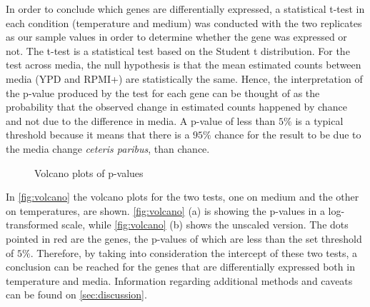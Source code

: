 \documentclass[11pt,twoside]{article}
\numberwithin{Theorem}{section}
\numberwithin{Definition}{section}
\numberwithin{Lemma}{section}
\numberwithin{Algorithm}{section}
\numberwithin{equation}{section}
\begin{document}
In order to conclude which genes are differentially expressed, a statistical t-test in each condition (temperature and medium) was conducted with the two replicates as our sample values in order to determine whether the gene was expressed or not. The t-test is a statistical test based on the Student t distribution. For the test across media, the null hypothesis is that the mean estimated counts between media (YPD and RPMI+) are statistically the same. Hence, the interpretation of the p-value produced by the test for each gene can be thought of as the probability that the observed change in estimated counts happened by chance and not due to the difference in media. A p-value of less than $5\%$ is a typical threshold because it means that there is a $95\%$ chance for the result to be due to the media change \emph{ceteris paribus}, than chance. 

\begin{figure}[h]
    \centering
    \caption{Volcano plots of p-values}
    \label{fig:volcano}
\end{figure}

In \autoref{fig:volcano} the volcano plots for the two tests, one on medium and the other on temperatures, are shown. \autoref{fig:volcano} (a) is showing the p-values in a log-transformed scale, while \autoref{fig:volcano} (b) shows the unscaled version. The dots pointed in red are the genes, the p-values of which are less than the set threshold of $5\%$.  Therefore, by taking into consideration the intercept of these two tests, a conclusion can be reached for the genes that are differentially expressed both in temperature and media. Information regarding additional methods and caveats can be found on \autoref{sec:discussion}.
\end{document}
